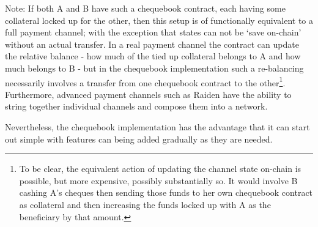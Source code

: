 Note: If both A and B have such a chequebook contract, each having some collateral locked up for the other, then this setup is of functionally equivalent to a full payment channel; with the exception that states can not be `save on-chain' without an actual transfer. In a real payment channel the contract can update the relative balance - how much of the tied up collateral belongs to A and how much belongs to B - but in the chequebook implementation such a re-balancing necessarily involves a transfer from one chequebook contract to the other\footnote{To be clear, the equivalent action of updating the channel state on-chain is possible, but more expensive, possibly substantially so. It would involve B cashing A's cheques then sending those funds to her own chequebook contract as collateral and then increasing the funds locked up with A as the beneficiary by that amount.}. Furthermore, advanced payment channels such as Raiden \cite{citation-needed:Raiden} have the ability to string together individual channels and compose them into a network.

Nevertheless, the chequebook implementation has the advantage that it can start out simple with features can being added gradually as they are needed.



